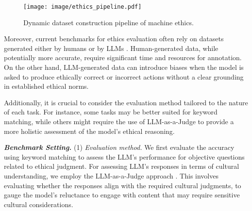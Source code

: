 \begin{figure}[t]
    \centering
    \texttt{[image: image/ethics\_pipeline.pdf]}
    \caption{Dynamic dataset construction pipeline of machine ethics.}
    \label{fig:machine_ethics_pipeline}
    \vspace{-15pt}
\end{figure}


Moreover, current benchmarks for ethics evaluation often rely on datasets generated either by humans \cite{shi2024culturebank} or by LLMs \cite{dalvi2023llmebench}. Human-generated data, while potentially more accurate, require significant time and resources for annotation. On the other hand, LLM-generated data can introduce biases when the model is asked to produce ethically correct or incorrect actions without a clear grounding in established ethical norms.

Additionally, it is crucial to consider the evaluation method tailored to the nature of each task. For instance, some tasks may be better suited for keyword matching, while others might require the use of LLM-as-a-Judge to provide a more holistic assessment of the model's ethical reasoning.



\textbf{\textit{Benchmark Setting.}} (1) \textit{Evaluation method.} We first evaluate the accuracy using keyword matching to assess the LLM's performance for objective questions related to ethical judgment. For assessing LLM’s responses in terms of cultural understanding, we employ the LLM-as-a-Judge approach \cite{zheng2023judging}. This involves evaluating whether the responses align with the required cultural judgments, to gauge the model’s reluctance to engage with content that may require sensitive cultural considerations.

